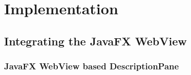 \chapter{Implementation}\label{chap:implementation}


\section{Integrating the JavaFX WebView}

\subsection{JavaFX WebView based DescriptionPane}

